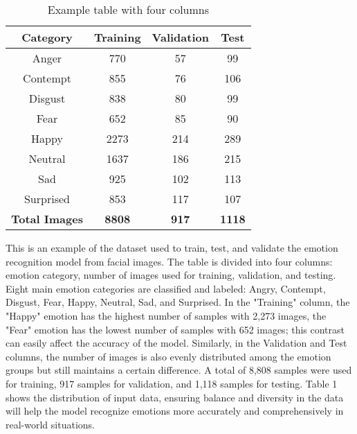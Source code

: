 \documentclass[a4paper,13pt]{report}
\begin{document}
\begin{table}[H]
    \centering
    \caption{Example table with four columns}
    \label{tab:example_table}
    \begin{tabular}{cccc}
        \toprule
        \textbf{Category} & \textbf{Training} & \textbf{Validation} & \textbf{Test} \\
        \midrule
            Anger & 770 & 57 & 99 \\
            Contempt & 855 & 76 & 106 \\
            Disgust & 838 & 80 & 99 \\
            Fear & 652 & 85 & 90 \\
            Happy & 2273 & 214 & 289 \\
            Neutral & 1637 & 186 & 215 \\
            Sad & 925 & 102 & 113 \\
            Surprised & 853 & 117 & 107 \\
        \bottomrule
        \textbf{Total Images} & \textbf{8808} & \textbf{917} & \textbf{1118} \\
    \end{tabular}
\end{table}

This is an example of the dataset used to train, test, and validate the emotion recognition model from facial images. The table is divided into four columns: emotion category, number of images used for training, validation, and testing. Eight main emotion categories are classified and labeled: Angry, Contempt, Disgust, Fear, Happy, Neutral, Sad, and Surprised. In the "Training" column, the "Happy" emotion has the highest number of samples with 2,273 images, the "Fear" emotion has the lowest number of samples with 652 images; this contrast can easily affect the accuracy of the model. Similarly, in the Validation and Test columns, the number of images is also evenly distributed among the emotion groups but still maintains a certain difference. A total of 8,808 samples were used for training, 917 samples for validation, and 1,118 samples for testing. Table 1 shows the distribution of input data, ensuring balance and diversity in the data will help the model recognize emotions more accurately and comprehensively in real-world situations.
\end{document}

